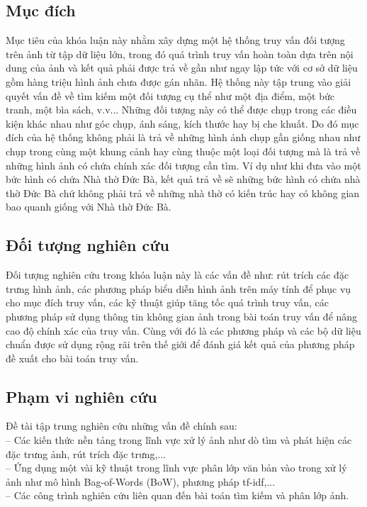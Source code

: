 \subsection{Mục đích}
Mục tiêu của khóa luận này nhằm xây dựng một hệ thống truy vấn đối tượng trên ảnh từ tập dữ liệu lớn, trong đó quá trình truy vấn hoàn toàn dựa trên nội dung của ảnh và kết quả phải được trả về gần như ngay lập tức với cơ sở dữ liệu gồm hàng triệu hình ảnh chưa được gán nhãn. Hệ thống này tập trung vào giải quyết vấn đề về tìm kiếm một đối tượng cụ thể như một địa điểm, một bức tranh, một bìa sách, v.v... Những đối tượng này có thể được chụp trong các điều kiện khác nhau như góc chụp, ánh sáng, kích thước hay bị che khuất. Do đó mục đích của hệ thống không phải là trả về những hình ảnh chụp gần giống nhau như chụp trong cùng một khung cảnh hay cùng thuộc một loại đối tượng mà là trả về những hình ảnh có chứa chính xác đối tượng cần tìm. Ví dụ như khi đưa vào một bức hình có chứa Nhà thờ Đức Bà, kết quả trả về sẽ những bức hình có chứa nhà thờ Đức Bà chứ không phải trả về những nhà thờ có kiến trúc hay có không gian bao quanh giống với Nhà thờ Đức Bà.

\subsection{Đối tượng nghiên cứu}
Đối tượng nghiên cứu trong khóa luận này là các vấn đề như: rút trích các đặc trưng hình ảnh, các phương pháp biểu diễn hình ảnh trên máy tính để phục vụ cho mục đích truy vấn, các kỹ thuật giúp tăng tốc quá trình truy vấn, các phương pháp sử dụng thông tin không gian ảnh trong bài toán truy vấn để nâng cao độ chính xác của truy vấn. Cùng với đó là các phương pháp và các bộ dữ liệu chuẩn được sử dụng rộng rãi trên thế giới để đánh giá kết quả của phương pháp đề xuất cho bài toán truy vấn.

\subsection{Phạm vi nghiên cứu}
Đề tài tập trung nghiên cứu những vấn đề chính sau:\\
-- Các kiến thức nền tảng trong lĩnh vực xử lý ảnh như dò tìm và phát hiện các đặc trưng ảnh, rút trích đặc trưng,...\\
-- Ứng dụng một vài kỹ thuật trong lĩnh vực phân lớp văn bản vào trong xử lý ảnh như mô hình Bag-of-Words (BoW), phương pháp tf-idf,...\\
-- Các công trình nghiên cứu liên quan đến bài toán tìm kiếm và phân lớp ảnh.

